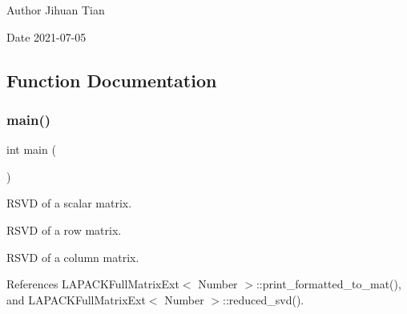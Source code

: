 \begin{DoxyAuthor}{Author}
Jihuan Tian 
\end{DoxyAuthor}
\begin{DoxyDate}{Date}
2021-\/07-\/05 
\end{DoxyDate}


\subsection{Function Documentation}
\mbox{\label{lapack-matrix-rsvd-degenerate-cases_8cc_ae66f6b31b5ad750f1fe042a706a4e3d4}} 
\subsubsection{\texorpdfstring{main()}{main()}}
{\footnotesize\ttfamily int main (\begin{DoxyParamCaption}{ }\end{DoxyParamCaption})}

R\+S\+VD of a scalar matrix.

R\+S\+VD of a row matrix.

R\+S\+VD of a column matrix.

References L\+A\+P\+A\+C\+K\+Full\+Matrix\+Ext$<$ Number $>$\+::print\+\_\+formatted\+\_\+to\+\_\+mat(), and L\+A\+P\+A\+C\+K\+Full\+Matrix\+Ext$<$ Number $>$\+::reduced\+\_\+svd().

